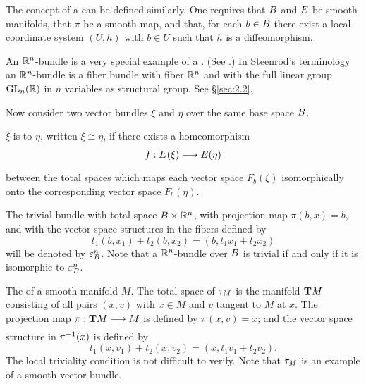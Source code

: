 \documentclass[../main]{subfiles}
\begin{document}
The concept of a  can be defined similarly. One requires that $B$ and $E$ be smooth manifolds, that $\pi$ be a smooth map, and that, for each $b\in B$ there exist a local coordinate system $(U, h)$ with $b \in U$ such that $h$ is a diffeomorphism.


\begin{remark*}
An $\mathbb R^n$-bundle is a very special example of a .
(See \cite{steenrodwhitehead1951}.) In Steenrod's terminology an $\mathbb R^n$-bundle is a
fiber bundle with fiber $\mathbb R^n$ and with the full linear group $\operatorname{GL}_n(\mathbb R)$ in $n$
variables as structural group. See \S\ref{sec:2.2}.
\end{remark*}


Now consider two vector bundles $\xi$ and $\eta$ over the same base space $B$.


\begin{definition}\label{def:02.02}
$\xi$ is  to $\eta$, written $\xi \cong \eta$, if there exists
a homeomorphism \[f:\total(\xi)\varrightarrow{}\total(\eta)\] between the total spaces which maps each vector space $F_b(\xi)$ isomorphically onto the corresponding vector space $F_b(\eta)$.
\end{definition}


\begin{example}\label{ex:02.01}
The trivial bundle with total space $B \times \mathbb R^n$, with 
projection map $\pi(b, x) = b$, and with the vector space structures in the fibers defined by
\[t_1(b,x_1) + t_2(b,x_2) = (b,t_1x_1 + t_2x_2)\]
will be denoted by $\varepsilon^n_{B}$. Note that a $\mathbb R^n$-bundle over ${B}$ is trivial
if and only if it is isomorphic to $\varepsilon^n_{{B}}$.
\end{example}


\begin{example}\label{ex:02.02}
The 
 of a smooth manifold $M$. The
total space of $\tau_{M}$ is the manifold $\mathbf{T}M$ consisting of all pairs $(x,v)$ with
$x \in M$ and $v$ tangent to $M$ at $x$. The projection map $\pi:\tangentTS M \varrightarrow{} M$
is defined by $\pi(x, v) = x$; and the vector space structure in $\pi^{-1}(x)$ is defined by
\[t_1(x,v_1) + t_2(x,v_2) = (x,t_1v_1 + t_2v_2). \]
The local triviality condition is not difficult to verify. Note that $\tau_{M}$ is
an example of a smooth vector bundle.
\end{example}
\end{document}
